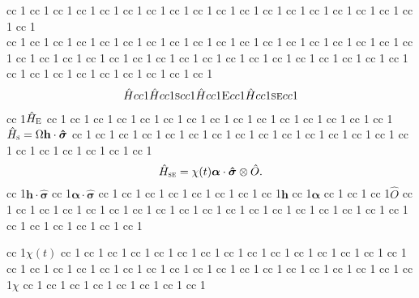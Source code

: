\documentclass[11pt]{article}
\begin{document}
 cc 1  cc 1  cc 1  cc 1  cc 1  cc 1  cc 1  cc 1  cc 1  cc 1  cc 1  cc 1  cc 1  cc 1  cc 1  cc 1  cc 1  cc 1  cc 1 \\  cc 1  cc 1  cc 1  cc 1  cc 1  cc 1  cc 1  cc 1  cc 1  cc 1  cc 1  cc 1  cc 1  cc 1  cc 1  cc 1  cc 1  cc 1  cc 1  cc 1  cc 1  cc 1  cc 1  cc 1  cc 1  cc 1  cc 1  cc 1  cc 1  cc 1  cc 1  cc 1  cc 1  cc 1  cc 1  cc 1  cc 1  cc 1  cc 1  cc 1  cc 1  cc 1  cc 1  cc 1
\begin{align}
\hat{H} cc 1\hat{H} cc 1{\textsc{s}} cc 1\hat{H} cc 1{\textsc{E}} cc 1\hat{H} cc 1{\textsc{se}} cc 1
\end{align}
 cc 1$\hat{H}_{\textsc{E}}$ cc 1  cc 1  cc 1  cc 1  cc 1  cc 1  cc 1  cc 1  cc 1  cc 1  cc 1  cc 1  cc 1  cc 1  cc 1$\hat{H}_{\textsc{s}}=\Omega \mathbf{h}\cdot \bm{\hat{\sigma}}$ cc 1  cc 1  cc 1  cc 1  cc 1  cc 1  cc 1  cc 1  cc 1  cc 1  cc 1  cc 1  cc 1  cc 1  cc 1  cc 1  cc 1  cc 1  cc 1  cc 1  cc 1
\begin{equation}
    \hat{H}_{\textsc{se}}= \chi(t) \bm{\alpha}\cdot\bm{\hat{\sigma}} \otimes\hat{{O}}.
\end{equation}
 cc 1$\mathbf{h}\cdot \bm{\hat{\sigma}}$ cc 1$\bm{\alpha}\cdot \bm{\hat{\sigma}}$ cc 1  cc 1  cc 1  cc 1  cc 1  cc 1  cc 1  cc 1$\mathbf{h}$ cc 1$\bm{\alpha}$ cc 1  cc 1  cc 1$\hat{{O}}$ cc 1  cc 1  cc 1  cc 1  cc 1  cc 1  cc 1  cc 1  cc 1  cc 1  cc 1  cc 1  cc 1  cc 1  cc 1  cc 1  cc 1  cc 1  cc 1  cc 1  cc 1  cc 1  cc 1  cc 1

 cc 1$\chi(t)$ cc 1  cc 1  cc 1  cc 1  cc 1  cc 1  cc 1  cc 1  cc 1  cc 1  cc 1  cc 1  cc 1  cc 1  cc 1  cc 1  cc 1  cc 1  cc 1  cc 1  cc 1  cc 1  cc 1  cc 1  cc 1  cc 1  cc 1  cc 1  cc 1  cc 1  cc 1  cc 1  cc 1$\chi$ cc 1  cc 1  cc 1  cc 1  cc 1  cc 1  cc 1  cc 1
\end{document}
